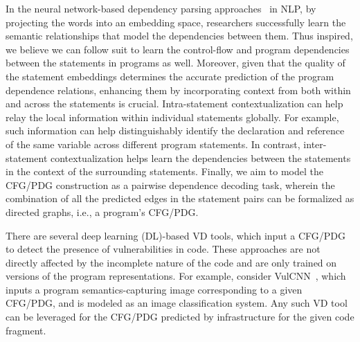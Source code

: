 \vspace{3pt}
In the neural network-based dependency parsing approaches~\cite{chen-manning-2014-fast} in NLP, by projecting the words into an embedding space, researchers successfully learn the semantic relationships that model the dependencies between them. Thus inspired, we believe we can follow suit to learn the control-flow and program dependencies between the statements in programs as well. Moreover, given that the quality of the statement embeddings determines the accurate prediction of the program dependence relations, enhancing them by incorporating context from both within and across the statements is crucial. Intra-statement contextualization can help relay the local information within individual statements globally. For example, such information can help distinguishably identify the declaration and reference of the same variable across different program statements. In contrast, inter-statement contextualization helps learn the dependencies between the statements in the context of the surrounding statements. Finally, we aim to model the CFG/PDG construction as a pairwise dependence decoding task, wherein the combination of all the predicted edges in the statement pairs can be formalized as directed graphs, i.e., a program's CFG/PDG.

\vspace{3pt}
 There are several deep learning (DL)-based VD tools, which input a CFG/PDG to detect the presence of vulnerabilities in code. These approaches are not directly affected by the incomplete nature of the code and are only trained on versions of the program representations. For example, consider VulCNN~\cite{wu2022vulcnn}, which inputs a program semantics-capturing image corresponding to a given CFG/PDG, and is modeled as an image classification system. Any such VD tool can be leveraged for the CFG/PDG predicted by \tool infrastructure for the given code fragment. 
